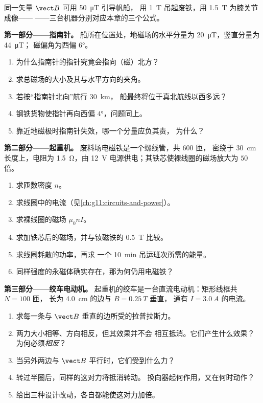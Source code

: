 \begin{problem}
\label{pb:g11:magnetic-fields:1}
同一矢量 $\vect B$ 可用 \qty{50}{\micro T} 引导帆船，
用 \qty{1}{T} 吊起废铁，用 \qty{1.5}{T} 为膝关节成像——
——三台机器分别对应本章的三个公式。

\medskip
\noindent\textbf{第一部分——指南针。}
船所在位置处，地磁场的水平分量为
\qty{20}{\micro T}，竖直分量为 \qty{44}{\micro T}；
磁偏角为西偏 $\ang{6}$。
\begin{enumerate}
  \item 为什么指南针的指针究竟会指向（磁）北方？
  \item 求总磁场的大小及其与水平方向的夹角。
  \item 若按“指南针北向”航行 \qty{30}{km}，
        船最终将位于真北航线以西多远？
  \item 钢铁货物使指针再向西偏 $\ang{4}$，问题同上。
  \item 靠近地磁极时指南针失效，哪一个分量应负其责，
        为什么？
\end{enumerate}

\medskip
\noindent\textbf{第二部分——起重机。}
废料场电磁铁是一个螺线管，共 $600$ 匝，
密绕于 \qty{30}{cm} 长度上，电阻为 \qty{1.5}{\ohm}，由 \qty{12}{V}
电源供电；其铁芯使裸线圈的磁场放大为 $50$ 倍。
\begin{enumerate}[resume]
  \item 求匝数密度 $n$。
  \item 求线圈中的电流（见\cref{ch:g11:circuits-and-power}）。
  \item 求裸线圈的磁场 $\mu_0 n I$。
  \item 求加铁芯后的磁场，并与钕磁铁的 \qty{0.5}{T} 比较。
  \item 求线圈耗散的功率，再求
        一个 \qty{10}{\minute} 吊运班次所需的能量。
  \item 同样强度的永磁体确实存在，那为何仍用电磁铁？
\end{enumerate}

\medskip
\noindent\textbf{第三部分——绞车电动机。}
起重机的绞车是一台直流电动机：矩形线框共 $N = 100$ 匝，
长为 \qty{4.0}{cm} 的边与 $B = \qty{0.25}{T}$ 垂直，
通有 $I = \qty{3.0}{A}$ 的电流。
\begin{enumerate}[resume]
  \item 求每一条与 $\vect B$ 垂直的边所受的拉普拉斯力。
  \item 两力大小相等、方向相反，但其效果并不会
        相互抵消。它们产生什么效果？为何必须\emph{相反}？
  \item 当另外两边与 $\vect B$ 平行时，它们受到什么力？
  \item 转过半圈后，同样的这对力将抵消转动。
        换向器起何作用，又在何时动作？
  \item 给出三种设计改动，各自都能使这对力加倍。
\end{enumerate}


\end{problem}
